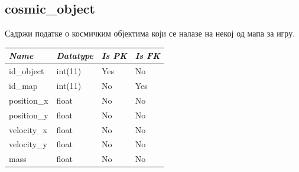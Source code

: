 \subsection{cosmic\_object}
Садржи податке о космичким објектима који се налазе на некој од мапа за игру.

\begin{table}[h!]
\centering
\small

    \begin{tabular}{ | m{} | m{} | m{} | m{} | }
    \hline
        \cellcolor{blue!25}\textbf{\textit{Name}} &

        \cellcolor{blue!25}\textbf{\textit{Datatype}} &
        \cellcolor{blue!25}\textbf{\textit{Is PK}} &
        \cellcolor{blue!25}\textbf{\textit{Is FK}} \\
    \hline
    \hline
        id\_object & int(11) & Yes & No \\
    \hline
        id\_map & int(11) & No & Yes \\
    \hline
        position\_x & float & No & No \\
    \hline
        position\_y & float & No & No \\
    \hline
        velocity\_x & float & No & No \\
    \hline
        velocity\_y & float & No & No \\
    \hline
        mass & float & No & No \\
    \hline
    \end{tabular}

\end{table}

